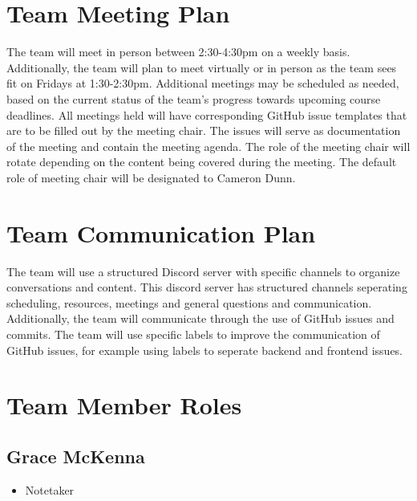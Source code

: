 \documentclass{article}
\begin{document}

\section{Team Meeting Plan}

The team will meet in person between 2:30-4:30pm on a weekly basis. 
Additionally, the team will plan to meet virtually or in person as the team sees fit on Fridays at 1:30-2:30pm.
Additional meetings may be scheduled as needed, based on the current status of the team's progress towards upcoming course deadlines. 
All meetings held will have corresponding GitHub issue templates that are to be filled out by the meeting chair. The issues will serve as documentation of the meeting and contain the meeting agenda.
The role of the meeting chair will rotate depending on the content being covered during the meeting. 
The default role of meeting chair will be designated to Cameron Dunn. 



\section{Team Communication Plan}

The team will use a structured Discord server with specific channels to organize conversations and content. 
This discord server has structured channels seperating scheduling, resources, meetings and general questions and communication. 
Additionally, the team will communicate through the use of GitHub issues and commits. 
The team will use specific labels to improve the communication of GitHub issues, for example using labels to seperate backend and frontend issues. 

\section{Team Member Roles}

\subsection*{Grace McKenna}
\begin{itemize}
	\item Notetaker
\end{itemize}
\end{document}
